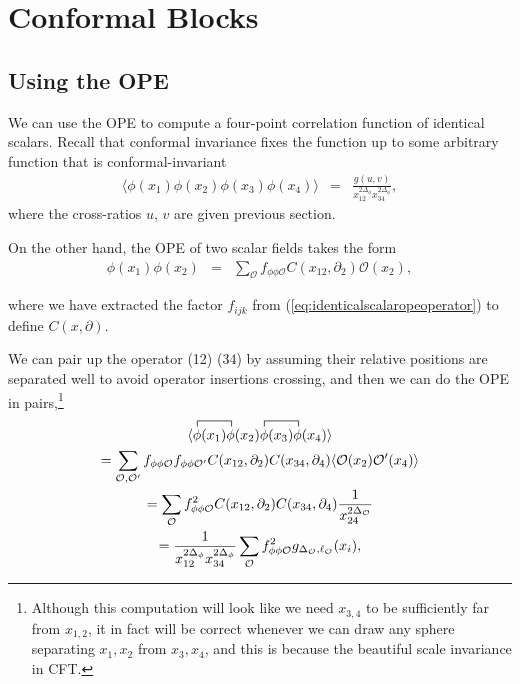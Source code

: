\documentclass[12pt]{article}
\numberwithin{equation}{section}
\newcommand\be{\begin{eqnarray}}
\newcommand\ee{\end{eqnarray}}
\newcommand\f\phi
\newcommand\cO{\mathcal{O}}
\newcommand\ptl\partial
\newcommand\<\langle
\renewcommand\>\rangle
\renewcommand\.{\cdot}
\newcommand\SO{\mathrm{SO}}
\newcommand\De{\Delta}
\begin{document}
\section{Conformal Blocks}

\subsection{Using the OPE}

We can use the OPE to compute a four-point correlation function of identical scalars. Recall that conformal invariance fixes the function up to some arbitrary function that is conformal-invariant
\be
\<\f(x_1)\f(x_2)\f(x_3)\f(x_4)\> &=& \frac{g(u, v)}{x_{12}^{2\De_\f}x_{34}^{2\De_\f}},
\ee
where the cross-ratios $u$, $v$ are given previous section.

On the other hand, the OPE of two scalar fields takes the form
\be
\label{eq:scalarscalarOPE}
\f(x_1)\f(x_2) &=& \sum_\cO f_{\f\f\cO} C(x_{12},\ptl_2)\cO(x_2),
\ee



where we have extracted the factor $f_{ijk}$ from (\ref{eq:identicalscalaropeoperator}) to define $C(x,\ptl)$.

We can pair up the operator (12) (34) by assuming their relative positions are separated well to avoid operator insertions crossing, and then we can do the OPE in pairs,\footnote{Although this computation will look like we need $x_{3,4}$ to be sufficiently far from $x_{1,2}$, it in fact will be correct whenever we can draw any sphere separating $x_1,x_2$ from $x_3,x_4$, and this is because the beautiful scale invariance in CFT.}
\begin{multline}
\<
\contraction{}{\f}{(x_1)}{\f}
\f(x_1)\f(x_2)
\contraction{}{\f}{(x_1)}{\f}
\f(x_3)\f(x_4)
\> \\
= \sum_{\cO,\cO'}f_{\f\f\cO}f_{\f\f\cO'} C(x_{12},\ptl_2)C(x_{34},\ptl_4)\<\cO(x_2)\cO'(x_4)\> \\
= \sum_\cO f_{\f\f\cO}^2 C(x_{12},\ptl_2)C(x_{34},\ptl_4)\frac{1}{x_{24}^{2\De_\cO}} \\
= \frac{1}{x_{12}^{2\De_\f} x_{34}^{2\De_\f}}\sum_\cO f_{\f\f\cO}^2 g_{\De_\cO,\ell_\cO}(x_i),
\end{multline}
\end{document}
